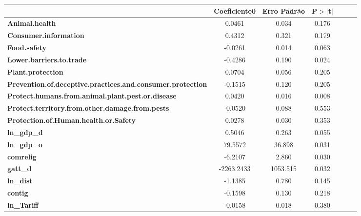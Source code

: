 \begin{center}
\begin{tabular}{lcccccc}
                                                                   & \textbf{Coeficiente0} & \textbf{Erro Padrão} &\textbf{P$> |$t$|$}\\
\midrule
\textbf{Animal.health}                                             &       0.0461  &        0.034     &        0.176\\
\textbf{Consumer.information}                                      &       0.4312  &        0.321     &        0.179\\
\textbf{Food.safety}                                               &      -0.0261  &        0.014     &        0.063\\
\textbf{Lower.barriers.to.trade}                                   &      -0.4286  &        0.190     &        0.024\\
\textbf{Plant.protection}                                          &       0.0704  &        0.056     &        0.205\\
\textbf{Prevention.of.deceptive.practices.and.consumer.protection} &      -0.1515  &        0.120     &        0.205\\
\textbf{Protect.humans.from.animal.plant.pest.or.disease}          &       0.0420  &        0.016     &        0.008\\
\textbf{Protect.territory.from.other.damage.from.pests}            &      -0.0520  &        0.088     &        0.553\\
\textbf{Protection.of.Human.health.or.Safety}                      &       0.0278  &        0.030     &        0.353\\
\textbf{ln\_gdp\_d}                                                &       0.5046  &        0.263     &        0.055\\
\textbf{ln\_gdp\_o}                                                &      79.5572  &       36.898     &        0.031\\
\textbf{comrelig}                                                  &      -6.2107  &        2.860     &        0.030\\
\textbf{gatt\_d}                                                   &   -2263.2433  &     1053.515     &        0.032\\
\textbf{ln\_dist}                                                  &      -1.1385  &        0.780     &        0.145\\
\textbf{contig}                                                    &      -0.1598  &        0.130     &        0.218\\
\textbf{ln\_Tariff}                                                &      -0.0158  &        0.018     &        0.380\\
\bottomrule
\end{tabular}
\end{center}